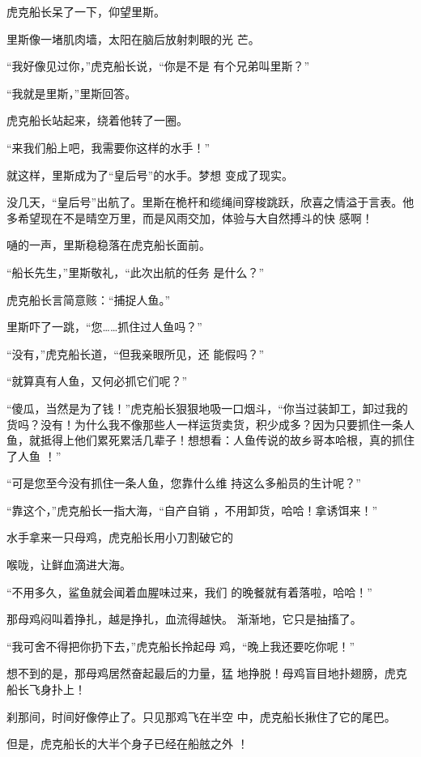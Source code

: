 \documentclass{article}
\begin{document}
虎克船长呆了一下，仰望里斯。 

里斯像一堵肌肉墙，太阳在脑后放射刺眼的光
芒。 

“我好像见过你，”虎克船长说，“你是不是
有个兄弟叫里斯？” 


\newpage

“我就是里斯，”里斯回答。 


虎克船长站起来，绕着他转了一圈。 


“来我们船上吧，我需要你这样的水手！” 

就这样，里斯成为了“皇后号”的水手。梦想
变成了现实。 

没几天，“皇后号”出航了。里斯在桅杆和缆绳间穿梭跳跃，欣喜之情溢于言表。他多希望现在不是晴空万里，而是风雨交加，体验与大自然搏斗的快
感啊！ 


嗵的一声，里斯稳稳落在虎克船长面前。 

“船长先生，”里斯敬礼，“此次出航的任务
是什么？” 


虎克船长言简意赅：“捕捉人鱼。” 


\newpage

里斯吓了一跳，“您……抓住过人鱼吗？” 

“没有，”虎克船长道，“但我亲眼所见，还
能假吗？” 


“就算真有人鱼，又何必抓它们呢？” 

“傻瓜，当然是为了钱！”虎克船长狠狠地吸一口烟斗，“你当过装卸工，卸过我的货吗？没有！为什么我不像那些人一样运货卖货，积少成多？因为只要抓住一条人鱼，就抵得上他们累死累活几辈子！想想看：人鱼传说的故乡哥本哈根，真的抓住了人鱼
！” 

“可是您至今没有抓住一条人鱼，您靠什么维
持这么多船员的生计呢？” 

“靠这个，”虎克船长一指大海，“自产自销
，不用卸货，哈哈！拿诱饵来！” 

水手拿来一只母鸡，虎克船长用小刀割破它的

\newpage
喉咙，让鲜血滴进大海。 

“不用多久，鲨鱼就会闻着血腥味过来，我们
的晚餐就有着落啦，哈哈！” 

那母鸡闷叫着挣扎，越是挣扎，血流得越快。
渐渐地，它只是抽搐了。 

“我可舍不得把你扔下去，”虎克船长拎起母
鸡，“晚上我还要吃你呢！” 

想不到的是，那母鸡居然奋起最后的力量，猛
地挣脱！母鸡盲目地扑翅膀，虎克船长飞身扑上！ 

刹那间，时间好像停止了。只见那鸡飞在半空
中，虎克船长揪住了它的尾巴。 

但是，虎克船长的大半个身子已经在船舷之外
！ 
\end{document}
